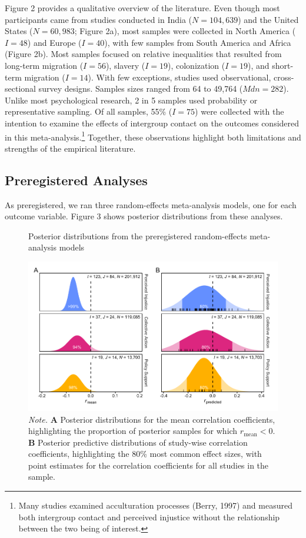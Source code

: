 \documentclass[twocolumn, 11pt, letterpaper]{article}
\begin{document}
Figure 2 provides a qualitative overview of the literature. Even though
most participants came from studies conducted in India (\(N = 104,639\))
and the United States (\(N = 60,983\); Figure 2a), most samples were
collected in North America (\(I = 48\)) and Europe (\(I = 40\)), with
few samples from South America and Africa (Figure 2b). Most samples
focused on relative inequalities that resulted from long-term migration
(\(I = 56\)), slavery (\(I = 19\)), colonization (\(I = 19\)), and
short-term migration (\(I = 14\)). With few exceptions, studies used
observational, cross-sectional survey designs. Samples sizes ranged from
64 to 49,764 (\(\textit{Mdn} = 282\)). Unlike most psychological
research, 2 in 5 samples used probability or representative sampling. Of
all samples, 55\% (\(I = 75\)) were collected with the intention to
examine the effects of intergroup contact on the outcomes considered in
this meta-analysis.\footnote{Many studies examined acculturation
  processes (Berry, 1997) and measured both intergroup contact and
  perceived injustice without the relationship between the two being of
  interest.} Together, these observations highlight both limitations and
strengths of the empirical literature.

\hypertarget{preregistered-analyses-1}{%
\subsection{Preregistered Analyses}\label{preregistered-analyses-1}}

As preregistered, we ran three random-effects meta-analysis models, one
for each outcome variable. Figure 3 shows posterior distributions from
these analyses.

\begin{figure}[t!]
\centering
\caption{Posterior distributions from the preregistered random-effects meta-analysis models}
\includegraphics[scale=1]{../figures/figure-3}
\caption*{\textit{Note.} \textbf{A} Posterior distributions for the mean correlation coefficients, highlighting the proportion of posterior samples for which $r_\text{mean} < 0$. \textbf{B} Posterior predictive distributions of study-wise correlation coefficients, highlighting the 80\% most common effect sizes, with point estimates for the correlation coefficients for all studies in the sample.}
\label{fig:f3}
\end{figure}
\end{document}
